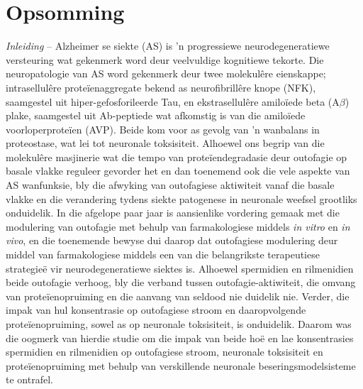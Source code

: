 \chapter{Opsomming}
\textit{Inleiding} – Alzheimer se siekte (AS) is 'n progressiewe neurodegeneratiewe versteuring wat gekenmerk word deur veelvuldige kognitiewe tekorte. Die neuropatologie van AS word gekenmerk deur twee molekul{\^e}re eienskappe; intrasellul{\^e}re prote{\"i}enaggregate bekend as neurofibrill{\^e}re knope (NFK), saamgestel uit hiper-gefosforileerde Tau, en ekstrasellul{\^e}re amilo{\"i}ede beta (A$\beta$) plake, saamgestel uit Ab-peptiede wat afkomstig is van die amilo{\"i}ede voorloperprote{\"i}en (AVP). Beide kom voor as gevolg van 'n wanbalans in proteostase, wat lei tot neuronale toksisiteit. Alhoewel ons begrip van die molekul{\^e}re masjinerie wat die tempo van prote{\"i}endegradasie deur outofagie op basale vlakke reguleer gevorder het en dan toenemend ook die vele aspekte van AS wanfunksie, bly die afwyking van outofagiese aktiwiteit vanaf die basale vlakke en die verandering tydens siekte patogenese in neuronale weefsel grootliks onduidelik. In die afgelope paar jaar is aansienlike vordering gemaak met die modulering van outofagie met behulp van farmakologiese middels \textit{in vitro} en \textit{in vivo}, en die toenemende bewyse dui daarop dat outofagiese modulering deur middel van farmakologiese middels een van die belangrikste terapeutiese strategie{\"e} vir neurodegeneratiewe siektes is. Alhoewel spermidien en rilmenidien beide outofagie verhoog, bly die verband tussen outofagie-aktiwiteit, die omvang van prote{\"i}enopruiming en die aanvang van seldood nie duidelik nie. Verder, die impak van hul konsentrasie op outofagiese stroom en daaropvolgende prote{\"i}enopruiming, sowel as op neuronale toksisiteit, is onduidelik. Daarom was die oogmerk van hierdie studie om die impak van beide ho{\"e} en lae konsentrasies spermidien en rilmenidien op outofagiese stroom, neuronale toksisiteit en prote{\"i}enopruiming met behulp van verskillende neuronale beseringsmodelsisteme te ontrafel.

